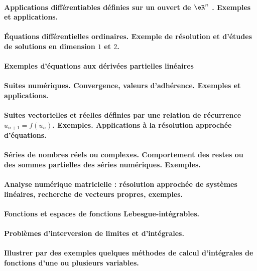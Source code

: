 \paragraph{Applications différentiables définies sur un ouvert de \( \eR^n\) . Exemples et applications.}
\paragraph{Équations différentielles ordinaires. Exemple de résolution et d'études de solutions en dimension \( 1\) et \( 2\).}
\paragraph{Exemples d'équations aux dérivées partielles linéaires}
\paragraph{Suites numériques. Convergence, valeurs d'adhérence. Exemples et applications.}
\paragraph{Suites vectorielles et réelles définies par une relation de récurrence \( u_{n+1}=f(u_n)\). Exemples. Applications à la résolution approchée d'équations.}
\paragraph{Séries  de  nombres  réels  ou  complexes. Comportement  des  restes  ou  des sommes partielles des séries numériques. Exemples.}
\paragraph{Analyse numérique matricielle : résolution approchée de systèmes linéaires, recherche de vecteurs propres, exemples.}
\paragraph{Fonctions et espaces de fonctions Lebesgue-intégrables.}
\paragraph{Problèmes d'interversion de limites et d'intégrales.}
\paragraph{Illustrer par des exemples quelques méthodes de calcul d'intégrales de fonctions d'une ou plusieurs variables.}

